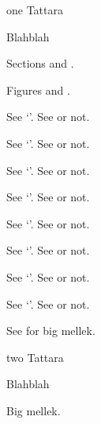 

\begin{NewFig}{one}
Tattara
\caption{Blahblah}
\end{NewFig}

Sections  and .

Figures  and .

See `'. See  or not.

See `'. See  or not.

See `'. See  or not.

See `'. See  or not.

See `'. See  or not.

See `'. See  or not.

See `'. See  or not.

See `'. See  or not.

See  for big mellek.



\begin{NewFig}{two}
Tattara
\caption{Blahblah}
\end{NewFig}

\appendix
{}

Big mellek.
